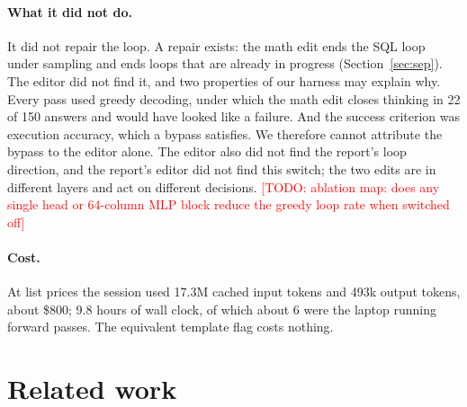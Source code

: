 \documentclass[11pt]{article}
\newcommand{\todo}[1]{\textcolor{red}{[TODO: #1]}}
\begin{document}
\paragraph{What it did not do.} It did not repair the loop. A repair exists: the math edit ends the SQL loop under sampling and ends loops that are already in progress (Section~\ref{sec:sep}). The editor did not find it, and two properties of our harness may explain why. Every pass used greedy decoding, under which the math edit closes thinking in 22 of 150 answers and would have looked like a failure. And the success criterion was execution accuracy, which a bypass satisfies. We therefore cannot attribute the bypass to the editor alone. The editor also did not find the report's loop direction, and the report's editor did not find this switch; the two edits are in different layers and act on different decisions. \todo{ablation map: does any single head or 64-column MLP block reduce the greedy loop rate when switched off}

\paragraph{Cost.} At list prices the session used 17.3M cached input tokens and 493k output tokens, about \$800; 9.8 hours of wall clock, of which about 6 were the laptop running forward passes. The equivalent template flag costs nothing.

\section{Related work}
\end{document}
